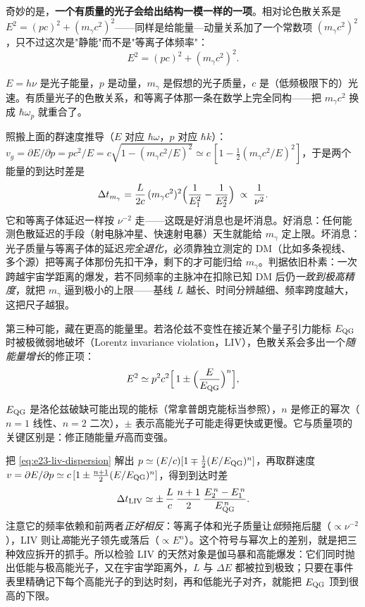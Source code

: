 奇妙的是，\textbf{一个有质量的光子会给出结构一模一样的一项}。相对论色散关系是 \(E^2=(pc)^2+(m_\gamma c^2)^2\)——同样是给能量—动量关系加了一个常数项 \((m_\gamma c^2)^2\)，只不过这次是"静能"而不是"等离子体频率"：
\begin{equation}
  E^2=(pc)^2+(m_\gamma c^2)^2 .
  \label{eq:e23-massive-photon}
\end{equation}
\begin{formulaexplain}
\(E=h\nu\) 是光子能量，\(p\) 是动量，\(m_\gamma\) 是假想的光子质量，\(c\) 是（低频极限下的）光速。有质量光子的色散关系，和等离子体那一条在数学上完全同构——把 \(m_\gamma c^2\) 换成 \(\hbar\omega_p\) 就重合了。
\end{formulaexplain}
照搬上面的群速度推导（\(E\) 对应 \(\hbar\omega\)，\(p\) 对应 \(\hbar k\)）：\(v_g=\partial E/\partial p=pc^2/E=c\sqrt{1-(m_\gamma c^2/E)^2}\simeq c\,[1-\tfrac12(m_\gamma c^2/E)^2]\)，于是两个能量的到达时差是
\[
  \Delta t_{m_\gamma}=\frac{L}{2c}\,(m_\gamma c^2)^2\Bigl(\frac{1}{E_1^2}-\frac{1}{E_2^2}\Bigr)
  \;\propto\;\frac{1}{\nu^2}.
\]
它和等离子体延迟一样按 \(\nu^{-2}\) 走——这既是好消息也是坏消息。好消息：任何能测色散延迟的手段（射电脉冲星、快速射电暴）天生就能给 \(m_\gamma\) 定上限。坏消息：光子质量与等离子体的延迟\emph{完全退化}，必须靠独立测定的 DM（比如多条视线、多个源）把等离子体那份先扣干净，剩下的才可能归给 \(m_\gamma\)。判据依旧朴素：一次跨越宇宙学距离的爆发，若不同频率的主脉冲在扣除已知 DM 后仍\emph{一致到极高精度}，就把 \(m_\gamma\) 逼到极小的上限——基线 \(L\) 越长、时间分辨越细、频率跨度越大，这把尺子越狠。

第三种可能，藏在更高的能量里。若洛伦兹不变性在接近某个量子引力能标 \(E_{\rm QG}\) 时被极微弱地破坏（Lorentz invariance violation，LIV），色散关系会多出一个\emph{随能量增长}的修正项：
\begin{equation}
  E^2\simeq p^2c^2\Bigl[\,1\pm\Bigl(\frac{E}{E_{\rm QG}}\Bigr)^{n}\Bigr],
  \label{eq:e23-liv-dispersion}
\end{equation}
\begin{formulaexplain}
\(E_{\rm QG}\) 是洛伦兹破缺可能出现的能标（常拿普朗克能标当参照），\(n\) 是修正的幂次（\(n=1\) 线性、\(n=2\) 二次），\(\pm\) 表示高能光子可能走得更快或更慢。它与质量项的关键区别是：修正随能量\emph{升}高而变强。
\end{formulaexplain}
把 \eqref{eq:e23-liv-dispersion} 解出 \(p\simeq(E/c)[1\mp\tfrac12(E/E_{\rm QG})^n]\)，再取群速度 \(v=\partial E/\partial p\simeq c\,[1\pm\tfrac{n+1}{2}(E/E_{\rm QG})^n]\)，得到到达时差
\[
  \Delta t_{\rm LIV}\simeq\pm\,\frac{L}{c}\,\frac{n+1}{2}\,\frac{E_2^{\,n}-E_1^{\,n}}{E_{\rm QG}^{\,n}} .
\]
注意它的频率依赖和前两者\emph{正好相反}：等离子体和光子质量让\emph{低}频拖后腿（\(\propto\nu^{-2}\)），LIV 则让\emph{高}能光子领先或落后（\(\propto E^{n}\)）。这个符号与幂次上的差别，就是把三种效应拆开的抓手。所以检验 LIV 的天然对象是伽马暴和高能爆发：它们同时抛出低能与极高能光子，又在宇宙学距离外，\(L\) 与 \(\Delta E\) 都被拉到极致；只要在事件表里精确记下每个高能光子的到达时刻，再和低能光子对齐，就能把 \(E_{\rm QG}\) 顶到很高的下限。

